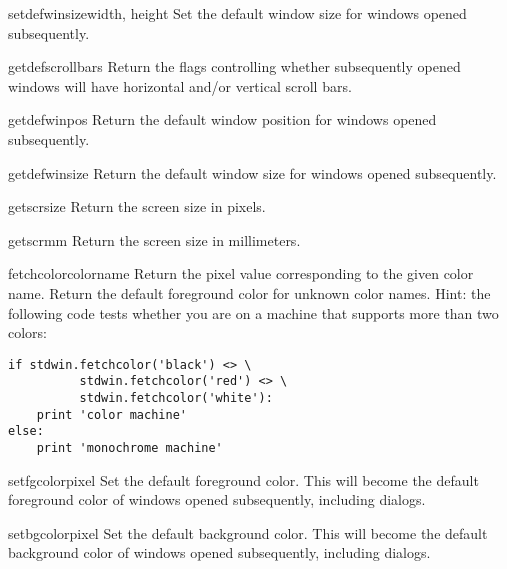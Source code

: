 \begin{funcdesc}{setdefwinsize}{width, height}
Set the default window size for windows opened subsequently.
\end{funcdesc}

\begin{funcdesc}{getdefscrollbars}{}
Return the flags controlling whether subsequently opened windows will
have horizontal and/or vertical scroll bars.
\end{funcdesc}

\begin{funcdesc}{getdefwinpos}{}
Return the default window position for windows opened subsequently.
\end{funcdesc}

\begin{funcdesc}{getdefwinsize}{}
Return the default window size for windows opened subsequently.
\end{funcdesc}

\begin{funcdesc}{getscrsize}{}
Return the screen size in pixels.
\end{funcdesc}

\begin{funcdesc}{getscrmm}{}
Return the screen size in millimeters.
\end{funcdesc}

\begin{funcdesc}{fetchcolor}{colorname}
Return the pixel value corresponding to the given color name.
Return the default foreground color for unknown color names.
Hint: the following code tests whether you are on a machine that
supports more than two colors:
\begin{verbatim}
if stdwin.fetchcolor('black') <> \
          stdwin.fetchcolor('red') <> \
          stdwin.fetchcolor('white'):
    print 'color machine'
else:
    print 'monochrome machine'
\end{verbatim}
\end{funcdesc}

\begin{funcdesc}{setfgcolor}{pixel}
Set the default foreground color.
This will become the default foreground color of windows opened
subsequently, including dialogs.
\end{funcdesc}

\begin{funcdesc}{setbgcolor}{pixel}
Set the default background color.
This will become the default background color of windows opened
subsequently, including dialogs.
\end{funcdesc}

